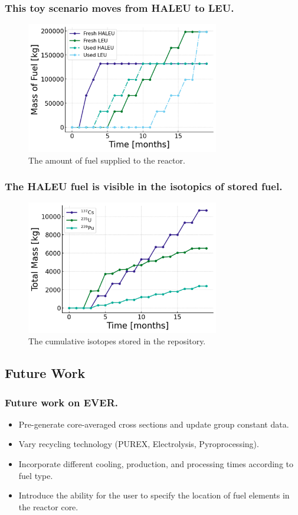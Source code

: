 \documentclass[9pt]{beamer}
\begin{document}
\begin{frame}
  \frametitle{This toy scenario moves from HALEU to LEU.}
  \begin{figure}
    \centering
    \includegraphics[width=0.75\textwidth]{images/mass_fuel.png}
    \caption{The amount of fuel supplied to the reactor.}
  \end{figure}
\end{frame}

\begin{frame}
  \frametitle{The HALEU fuel is visible in the isotopics of stored fuel.}
  \begin{figure}
    \centering
    \includegraphics[width=0.75\textwidth]{images/mass_isotopes.png}
    \caption{The cumulative isotopes stored in the repository.}
  \end{figure}
\end{frame}

\subsection{Future Work}
\begin{frame}
  \frametitle{Future work on EVER.}
  \begin{itemize}
    \item Pre-generate core-averaged cross sections and update group constant data.
    \item Vary recycling technology (PUREX, Electrolysis, Pyroprocessing).
    \item Incorporate different cooling, production, and processing times according to fuel type.
    \item Introduce the ability for the user to specify the location of fuel elements in the reactor core.
  \end{itemize}
\end{frame}
\end{document}
